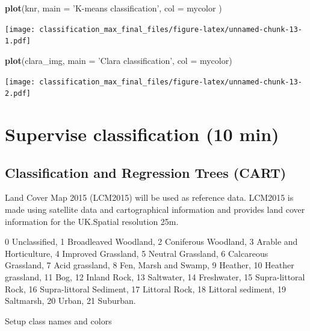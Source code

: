 \documentclass[]{article}
\newenvironment{Shaded}{\begin{snugshade}}{\end{snugshade}}
\newcommand{\DataTypeTok}[1]{\textcolor[rgb]{0.13,0.29,0.53}{#1}}
\newcommand{\KeywordTok}[1]{\textcolor[rgb]{0.13,0.29,0.53}{\textbf{#1}}}
\newcommand{\NormalTok}[1]{#1}
\newcommand{\StringTok}[1]{\textcolor[rgb]{0.31,0.60,0.02}{#1}}
\begin{document}
\begin{Shaded}
\begin{Highlighting}[]
\KeywordTok{plot}\NormalTok{(knr, }\DataTypeTok{main =} \StringTok{'K-means classification'}\NormalTok{, }\DataTypeTok{col =}\NormalTok{ mycolor )}
\end{Highlighting}
\end{Shaded}

\texttt{[image: classification\_max\_final\_files/figure-latex/unnamed-chunk-13-1.pdf]}

\begin{Shaded}
\begin{Highlighting}[]
\KeywordTok{plot}\NormalTok{(clara_img, }\DataTypeTok{main =} \StringTok{'Clara classification'}\NormalTok{, }\DataTypeTok{col =}\NormalTok{ mycolor)}
\end{Highlighting}
\end{Shaded}

\texttt{[image: classification\_max\_final\_files/figure-latex/unnamed-chunk-13-2.pdf]}

\hypertarget{supervise-classification-10-min}{%
\section{Supervise classification (10
min)}\label{supervise-classification-10-min}}

\hypertarget{classification-and-regression-trees-cart}{%
\subsection{Classification and Regression Trees
(CART)}\label{classification-and-regression-trees-cart}}

Land Cover Map 2015 (LCM2015) will be used as reference data. LCM2015 is
made using satellite data and cartographical information and provides
land cover information for the UK.Spatial resolution 25m.

0 Unclassified, 1 Broadleaved Woodland, 2 Coniferous Woodland, 3 Arable
and Horticulture, 4 Improved Grassland, 5 Neutral Grassland, 6
Calcareous Grassland, 7 Acid grassland, 8 Fen, Marsh and Swamp, 9
Heather, 10 Heather grassland, 11 Bog, 12 Inland Rock, 13 Saltwater, 14
Freshwater, 15 Supra-littoral Rock, 16 Supra-littoral Sediment, 17
Littoral Rock, 18 Littoral sediment, 19 Saltmarsh, 20 Urban, 21
Suburban.

Setup class names and colors
\end{document}

